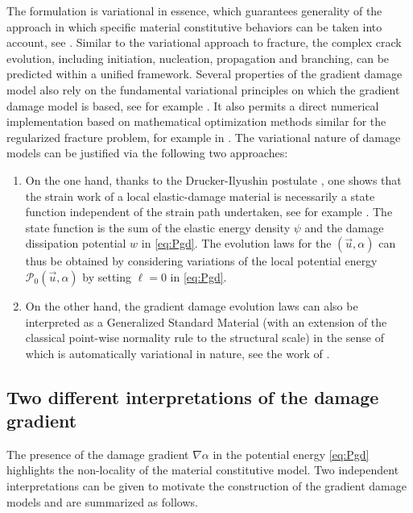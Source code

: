 The formulation is variational in essence, which guarantees generality of the approach in which specific material constitutive behaviors can be taken into account, see \cite{PhamMarigoMaurini:2011,PhamMarigo:2013}. Similar to the variational approach to fracture, the complex crack evolution, including initiation, nucleation, propagation and branching, can be predicted within a unified framework. Several properties of the gradient damage model also rely on the fundamental variational principles on which the gradient damage model is based, see for example \cite{SicsicMarigo:2013,SicsicMarigoMaurini:2013}. It also permits a direct numerical implementation based on mathematical optimization methods similar for the regularized fracture problem, for example in \cite{AmorMarigoMaurini:2009,PhamAmorMarigoMaurini:2011}. The variational nature of damage models can be justified via the following two approaches:
\begin{enumerate}
\item On the one hand, thanks to the Drucker-Ilyushin postulate \cite{Marigo:2002}, one shows that the strain work of a local elastic-damage material is necessarily a state function independent of the strain path undertaken, see for example \cite{PhamMarigo:2010}. The state function is the sum of the elastic energy density $\psi$ and the damage dissipation potential $w$ in \eqref{eq:Pgd}. The evolution laws for the $(\vec{u},\alpha)$ can thus be obtained by considering variations of the local potential energy $\mathcal{P}_0(\vec{u},\alpha)$ by setting $\ell=0$ in \eqref{eq:Pgd}.

\item On the other hand, the gradient damage evolution laws can also be interpreted as a Generalized Standard Material (with an extension of the classical point-wise normality rule to the structural scale) in the sense of \cite{Halphen:1975aa} which is automatically variational in nature, see the work of \cite{LorentzAndrieux:1999,LorentzBenallal:2005}.
\end{enumerate}

\subsection{Two different interpretations of the damage gradient} \label{sec:twointerpretations}
The presence of the damage gradient $\nabla\alpha$ in the potential energy \eqref{eq:Pgd} highlights the non-locality of the material constitutive model. Two independent interpretations can be given to motivate the construction of the gradient damage models and are summarized as follows.

